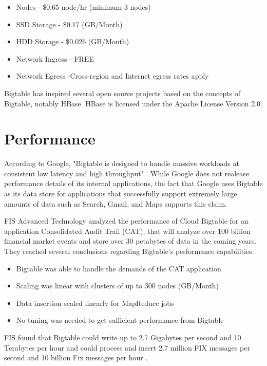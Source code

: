 \documentclass[9pt,twocolumn,twoside]{styles/osajnl}
\begin{document}
\vspace{-\topsep}
\begin{itemize}
\item Nodes - \$0.65 node/hr (minimum 3 nodes) 
\item SSD Storage -  \$0.17 (GB/Month)  
\item HDD Storage - \$0.026 (GB/Month) 
\item Network Ingress - FREE 
\item Network Egress -Cross-region and Internet egress rates apply  
\end{itemize}
\vspace{-\topsep}


Bigtable has inspired several open source projects based on the concepts of Bigtable, notably HBase. HBase is licensed under the Apache License Version 2.0.


\section{Performance}

According to Google, "Bigtable is designed to handle massive workloads at consistent low latency and high throughput" \cite{www-cloudbigtable}.  While Google does not realease performance details of its internal applications, the fact that Google uses Bigtable as its data store for applications that successfully support extremely large amounts of data such as Search, Gmail, and Maps supports this claim.

FIS Advanced Technology analyzed the performance of Cloud Bigtable for an application Consolidated Audit Trail (CAT), that will analyze over 100 billion financial market events and store over 30 petabytes of data in the coming years.  They reached several conclusions regarding Bigtable's performance capabilities.
\vspace{-\topsep}
\begin{itemize}
\item Bigtable was able to handle the demands of the CAT application 
\item Scaling was linear with clusters of up to 300 nodes (GB/Month)  
\item Data insertion scaled linearly for MapReduce jobs 
\item No tuning was needed to get sufficient performance from Bigtable
\end{itemize}
\vspace{-\topsep}

FIS found that Bigtable could write up to 2.7 Gigabytes per second and 10 Terabytes per hour and could process and insert 2.7 million FIX messages per second and 10 billion Fix messages per hour \cite{www-fis}.
\end{document}

